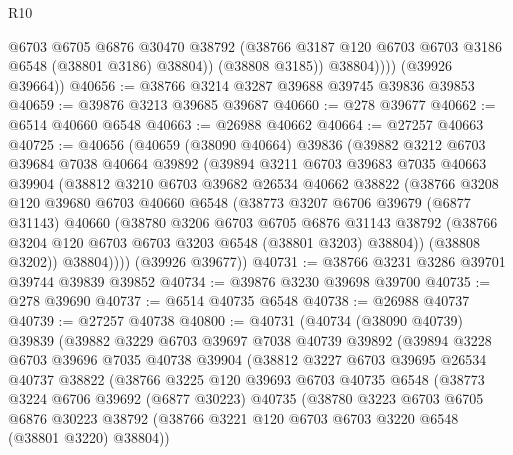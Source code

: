 \begin{lexlean}{R10}
\begin{coremodule}
                  @6703
                  @6705
                  @6876
                  @30470
                  @38792
                  (@38766 @3187 @120 @6703 @6703 @3186 @6548 (@38801 @3186) @38804))
                (@38808 @3185))
              @38804))))
      (@39926 @39664))
@40656 := @38766 @3214 @3287 @39688 @39745 @39836 @39853
@40659 := @39876 @3213 @39685 @39687
@40660 := @278 @39677
@40662 := @6514 @40660 @6548
@40663 := @26988 @40662
@40664 := @27257 @40663
@40725 := @40656
    (@40659
      (@38090 @40664)
      @39836
      (@39882
        @3212
        @6703
        @39684
        @7038
        @40664
        @39892
        (@39894
          @3211
          @6703
          @39683
          @7035
          @40663
          @39904
          (@38812
            @3210
            @6703
            @39682
            @26534
            @40662
            @38822
            (@38766
              @3208
              @120
              @39680
              @6703
              @40660
              @6548
              (@38773
                @3207
                @6706
                @39679
                (@6877 @31143)
                @40660
                (@38780
                  @3206
                  @6703
                  @6705
                  @6876
                  @31143
                  @38792
                  (@38766 @3204 @120 @6703 @6703 @3203 @6548 (@38801 @3203) @38804))
                (@38808 @3202))
              @38804))))
      (@39926 @39677))
@40731 := @38766 @3231 @3286 @39701 @39744 @39839 @39852
@40734 := @39876 @3230 @39698 @39700
@40735 := @278 @39690
@40737 := @6514 @40735 @6548
@40738 := @26988 @40737
@40739 := @27257 @40738
@40800 := @40731
    (@40734
      (@38090 @40739)
      @39839
      (@39882
        @3229
        @6703
        @39697
        @7038
        @40739
        @39892
        (@39894
          @3228
          @6703
          @39696
          @7035
          @40738
          @39904
          (@38812
            @3227
            @6703
            @39695
            @26534
            @40737
            @38822
            (@38766
              @3225
              @120
              @39693
              @6703
              @40735
              @6548
              (@38773
                @3224
                @6706
                @39692
                (@6877 @30223)
                @40735
                (@38780
                  @3223
                  @6703
                  @6705
                  @6876
                  @30223
                  @38792
                  (@38766 @3221 @120 @6703 @6703 @3220 @6548 (@38801 @3220) @38804))

\end{coremodule}
\end{lexlean}
